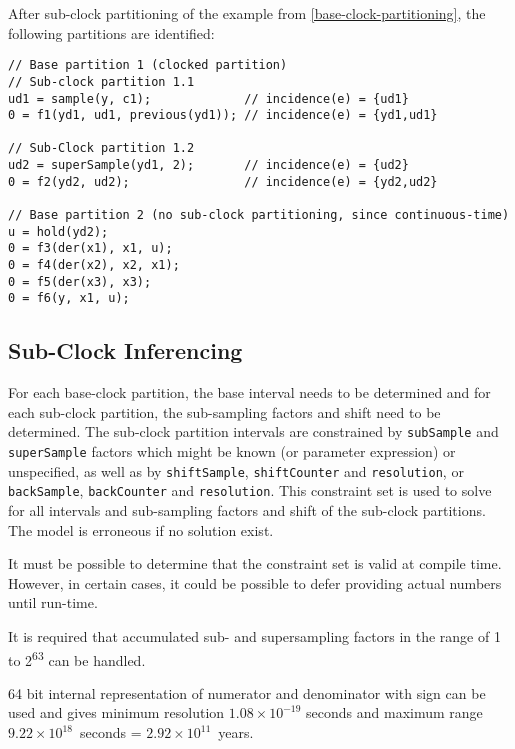 \begin{example}
After sub-clock partitioning of the example from \cref{base-clock-partitioning}, the following partitions are identified:
\begin{lstlisting}[language=modelica]
// Base partition 1 (clocked partition)
// Sub-clock partition 1.1
ud1 = sample(y, c1);             // incidence(e) = {ud1}
0 = f1(yd1, ud1, previous(yd1)); // incidence(e) = {yd1,ud1}

// Sub-Clock partition 1.2
ud2 = superSample(yd1, 2);       // incidence(e) = {ud2}
0 = f2(yd2, ud2);                // incidence(e) = {yd2,ud2}

// Base partition 2 (no sub-clock partitioning, since continuous-time)
u = hold(yd2);
0 = f3(der(x1), x1, u);
0 = f4(der(x2), x2, x1);
0 = f5(der(x3), x3);
0 = f6(y, x1, u);
\end{lstlisting}
\end{example}

\subsection{Sub-Clock Inferencing}\label{sub-clock-inferencing}

For each base-clock partition, the base interval needs to be determined and for each sub-clock partition, the sub-sampling factors and shift need to be determined.
The sub-clock partition intervals are constrained by \lstinline!subSample! and \lstinline!superSample! factors which might be known (or parameter expression) or unspecified, as well as by \lstinline!shiftSample!, \lstinline!shiftCounter! and \lstinline!resolution!, or \lstinline!backSample!, \lstinline!backCounter! and \lstinline!resolution!.
This constraint set is used to solve for all intervals and sub-sampling factors and shift of the sub-clock partitions.
The model is erroneous if no solution exist.

\begin{nonnormative}
It must be possible to determine that the constraint set is valid at compile time.  However, in certain cases, it could be possible to defer providing actual numbers until run-time.
\end{nonnormative}

It is required that accumulated sub- and supersampling factors in the range of 1 to 2\textsuperscript{63} can be handled.

\begin{nonnormative}
64 bit internal representation of numerator and denominator with sign can be used and gives minimum resolution $1.08\times 10^{-19}$ seconds and maximum range $9.22\times 10^{18}$~seconds = $2.92\times 10^{11}$~years.
\end{nonnormative}


